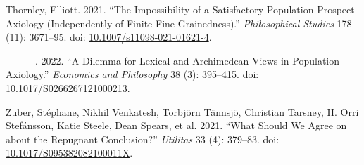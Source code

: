 \documentclass[
  11pt,
  letterpaper,
  DIV=11,
  numbers=noendperiod,
  twoside]{scrartcl}
\newlength{\cslhangindent}
\newenvironment{CSLReferences}[2] %
 {\begin{list}{}{%
  \setlength{\itemindent}{0pt}
  \setlength{\leftmargin}{0pt}
  \setlength{\parsep}{0pt}
  \ifodd #1
   \setlength{\leftmargin}{\cslhangindent}
   \setlength{\itemindent}{-1\cslhangindent}
  \fi
  \setlength{\itemsep}{#2\baselineskip}}}
 {\end{list}}
\begin{document}
\begin{CSLReferences}{1}{0}
Thornley, Elliott. 2021. {``The Impossibility of a Satisfactory
Population Prospect Axiology (Independently of {F}inite
{F}ine-{G}rainedness).''} \emph{Philosophical Studies} 178 (11):
3671--95. doi:
\href{https://doi.org/10.1007/s11098-021-01621-4}{10.1007/s11098-021-01621-4}.

---------. 2022. {``A Dilemma for Lexical and {A}rchimedean Views in
Population Axiology.''} \emph{Economics and Philosophy} 38 (3):
395--415. doi:
\href{https://doi.org/10.1017/S0266267121000213}{10.1017/S0266267121000213}.

Zuber, Stéphane, Nikhil Venkatesh, Torbjörn Tännsjö, Christian Tarsney,
H. Orri Stefánsson, Katie Steele, Dean Spears, et al. 2021. {``What
Should We Agree on about the Repugnant Conclusion?''} \emph{Utilitas} 33
(4): 379--83. doi:
\href{https://doi.org/10.1017/S095382082100011X}{10.1017/S095382082100011X}.

\end{CSLReferences}
\end{document}
